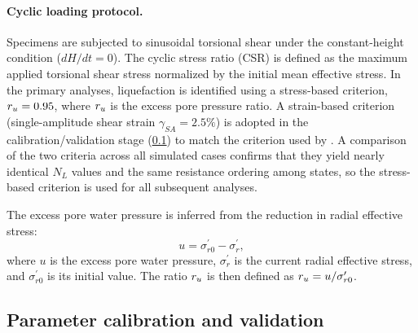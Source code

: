 \paragraph{Cyclic loading protocol.}
Specimens are subjected to sinusoidal torsional shear under the constant-height condition ($dH/dt=0$). The cyclic stress ratio (CSR) is defined as the maximum applied torsional shear stress normalized by the initial mean effective stress. In the primary analyses, liquefaction is identified using a stress-based criterion, $r_u = 0.95$, where $r_u$ is the excess pore pressure ratio. A strain-based criterion (single-amplitude shear strain $\gamma_{SA}=2.5\%$) is adopted in the calibration/validation stage (\cref{subsec:calibration_validation}) to match the criterion used by \citet{Ishihara1985}. A comparison of the two criteria across all simulated cases confirms that they yield nearly identical $N_L$ values and the same resistance ordering among \Kzero{} states, so the stress-based criterion is used for all subsequent analyses.

The excess pore water pressure is inferred from the reduction in radial effective stress:
\begin{equation}
u = \sigma_{r0}^{\prime} - \sigma_r^{\prime},
\label{eq:epwp_definition}
\end{equation}
where $u$ is the excess pore water pressure, $\sigma_r^{\prime}$ is the current radial effective stress, and $\sigma_{r0}^{\prime}$ is its initial value. The ratio $r_u$ is then defined as $r_u = u/\sigma_{r0}^{\prime}$.

\subsection{Parameter calibration and validation}
\label{subsec:calibration_validation}

